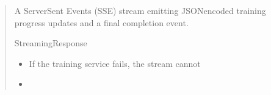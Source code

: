 \documentclass[letterpaper,10pt,english]{sphinxmanual}
\begin{document}
\begin{fulllineitems}
\begin{quote}
\begin{description}
\begin{itemize}
\end{itemize}

\sphinxAtStartPar
A Server\sphinxhyphen{}Sent Events (SSE) stream emitting
JSON\sphinxhyphen{}encoded training progress updates and a final completion
event.

\sphinxAtStartPar
StreamingResponse

\begin{itemize}
\item {} 
\sphinxAtStartPar
{} \textendash{} If the training service fails, the stream cannot

\item {} 
\sphinxAtStartPar
{} \textendash{} 

\end{itemize}

\end{description}\end{quote}

\end{fulllineitems}

\end{document}
